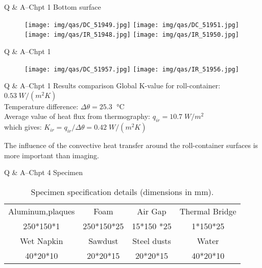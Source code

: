 \begin{frame}{Q \& A--Chpt 1 \small{Bottom surface}}
    \begin{figure}
    \texttt{[image: img/qas/DC\_51949.jpg]}
    \texttt{[image: img/qas/DC\_51951.jpg]}\\
    \texttt{[image: img/qas/IR\_51948.jpg]}
    \texttt{[image: img/qas/IR\_51950.jpg]}
    \end{figure}

\end{frame}

\begin{frame}{Q \& A--Chpt 1}
    \begin{figure}
    \texttt{[image: img/qas/DC\_51957.jpg]}
    \texttt{[image: img/qas/IR\_51956.jpg]}

    \end{figure}

\end{frame}


\begin{frame}{Q \& A--Chpt 1 \small{Results comparison}}
Global K-value for roll-container:  $0.53\; W/(m^2 K)$\\
Temperature  difference: $\Delta \theta = 25.3 \;$ °C\\
\bigskip
Average value of heat flux from thermography: $q_{ir} = 10.7\; W/m^2$\\
which gives:
$K_{ir} = q_{ir}/\Delta \theta = 0.42\; W/(m^2 K)$

\bigskip
The influence of the convective heat transfer around the roll-container surfaces is more important than imaging.
\end{frame}

\begin{frame}{Q \& A--Chpt 4 \small{Specimen}}
    \begin{table}
    \centering

    \caption{Specimen specification details (dimensions in mm).}
    \hspace*{-20pt}
    \small
    \begin{tabular}{c|c|c|c}
        \hline
         Aluminum,plaques & Foam       & Air Gap     & Thermal Bridge \\
         250*150*1        & 250*150*25 & 15*150 *25  & 1*150*25       \\ 
         \hline
         Wet Napkin       & Sawdust    & Steel dusts & Water          \\ 
         40*20*10         & 20*20*15   & 20*20*15    & 40*20*10       \\ 
         \hline
    \end{tabular}
    \end{table}
\end{frame}



